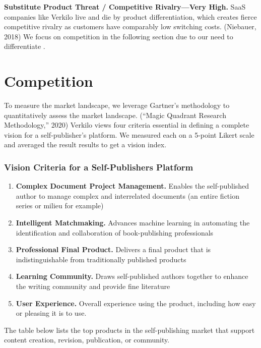 \documentclass[11pt,openany]{book}
\providecommand{\tightlist}{%
  \setlength{\itemsep}{0pt}\setlength{\parskip}{0pt}}
\begin{document}
\textbf{Substitute Product Threat / Competitive Rivalry---Very High.}
SaaS companies like Verkilo live and die by product differentiation,
which creates fierce competitive rivalry as customers have comparably
low switching costs. (Niebauer, 2018) We focus on competition in the
following section due to our need to differentiate .

\hypertarget{competition}{%
\section{Competition}\label{competition}}

To measure the market landscape, we leverage Gartner's methodology to
quantitatively assess the market landscape. (``Magic Quadrant Research
Methodology,'' 2020) Verkilo views four criteria essential in defining a
complete vision for a self-publisher's platform. We measured each on a
5-point Likert scale and averaged the result results to get a vision
index.

\hypertarget{vision-criteria-for-a-self-publishers-platform}{%
\subsubsection{Vision Criteria for a Self-Publishers
Platform}\label{vision-criteria-for-a-self-publishers-platform}}

\begin{enumerate}
\def\labelenumi{\arabic{enumi}.}
\tightlist
\item
  \textbf{Complex Document Project Management.} Enables the
  self-published author to manage complex and interrelated documents (an
  entire fiction series or milieu for example)
\item
  \textbf{Intelligent Matchmaking.} Advances machine learning in
  automating the identification and collaboration of book-publishing
  professionals
\item
  \textbf{Professional Final Product.} Delivers a final product that is
  indistinguishable from traditionally published products
\item
  \textbf{Learning Community.} Draws self-published authors together to
  enhance the writing community and provide fine literature
\item
  \textbf{User Experience.} Overall experience using the product,
  including how easy or pleasing it is to use.
\end{enumerate}

The table below lists the top products in the self-publishing market
that support content creation, revision, publication, or community.
\end{document}
